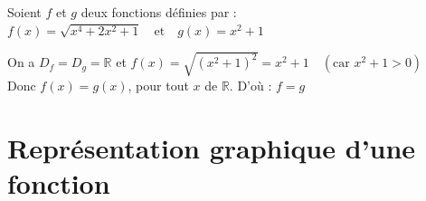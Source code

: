 \begin{Exemple}[][10 min]
Soient $f$ et $g$ deux fonctions définies par :
 $f(x) = \sqrt{x^4 + 2x^2 + 1} \quad \text{et} \quad g(x) = x^2 + 1 $
 
\vspace{0.2cm}
On a $D_f = D_g = \mathbb{R}$ et
$f(x) = \sqrt{(x^2 + 1)^2} = x^2 + 1 \quad (\text{car } x^2 + 1 > 0)$ \\
Donc $f(x) = g(x)$, pour tout $x$ de $\mathbb{R}$.
D'où : \quad $f = g$
\end{Exemple}




\section{Représentation graphique d'une fonction }


